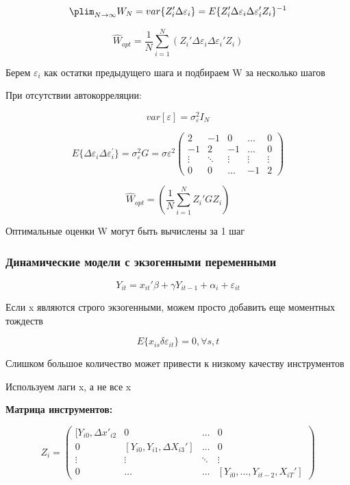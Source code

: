 \documentclass[a4paper, 12pt]{article}
\begin{document}
\[\plim_{N \to \infty} W_N = var\{Z_i'\Delta \varepsilon_i\} 
= E\{Z_i'\Delta \varepsilon_i \Delta \varepsilon_i' Z_i\}^{-1}\]

\[\hat{W}_{opt} = \frac{1}{N} \sum_{i = 1}^N (Z_i'\Delta \varepsilon_i \Delta \varepsilon_i' Z_i)\]

Берем $\varepsilon_i$ как остатки предыдущего шага и подбираем W
за несколько шагов

При отсутствии автокорреляции:

\[var[\varepsilon] = \sigma_{\varepsilon}^2 I_N\]

\[E\{\Delta \varepsilon_{i} \Delta \varepsilon_i^{\prime}\} = 
\sigma_{\varepsilon}^2 G = \sigma{\varepsilon}^2
\begin{pmatrix}
    2 & -1 & 0 & \ldots & 0 \\
    -1 & 2 & -1 & \ldots & 0 \\
    \vdots & \ddots & \vdots & \vdots & \vdots \\
    0 & 0 & \ldots & - 1 & 2
\end{pmatrix}\]

\[\hat{W}_{opt} = \left(\frac{1}{N}\sum_{i = 1}^N Z_i'G Z_i \right)\]

Оптимальные оценки W могут быть вычислены за 1 шаг

\subsubsection{Динамические модели с экзогенными переменными}

\[Y_{it} = x_{it}'\beta + \gamma Y_{it - 1} + \alpha_i + \varepsilon_{it}\]

Если x являются строго экзогенными, можем просто добавить еще
моментных тождеств

\[E\{x_{is}\delta \varepsilon_{it}\} = 0, \forall s, t\]

Слишком большое количество может привести к низкому качеству инструментов

Используем лаги x, а не все x

\textbf{Матрица инструментов:}

\[Z_i = 
\begin{pmatrix}
    [Y_{i0}, \Delta x'_{i2} & 0 & \ldots & 0 \\
    0 & [Y_{i0}, Y_{i1}, \Delta X_{i3}'] & \ldots & 0 \\
    \vdots & \vdots & \ddots & \vdots \\
    0 & \ldots & \ldots & [Y_{i0}, \ldots, Y_{it - 2}, X_{iT}']
\end{pmatrix}\]
\end{document}
